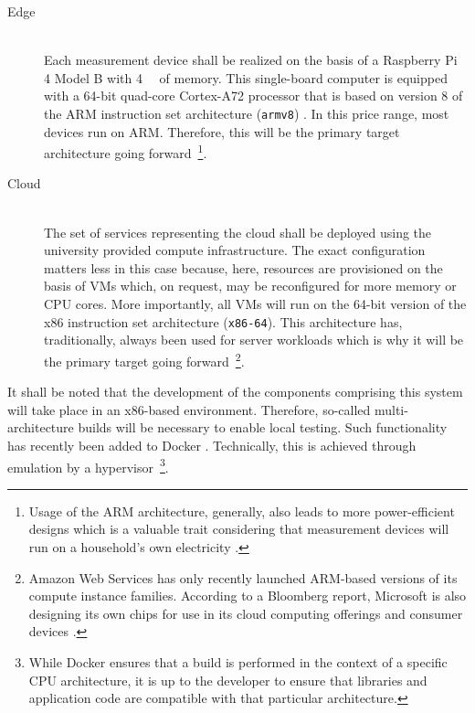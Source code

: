 \begin{description}
  \item[Edge]
  \hfill \\
  Each measurement device shall be realized on the basis of a Raspberry Pi 4 Model B with \SI{4}{\giga\byte} of memory. This single-board computer is equipped with a 64-bit quad-core Cortex-A72 processor that is based on version 8 of the \acs{ARM} instruction set architecture (\texttt{armv8}) \cite{raspberrypi4} \cite{arm2020v8a}. In this price range, most devices run on \acs{ARM}. Therefore, this will be the primary target architecture going forward~\footnote{Usage of the \acs{ARM} architecture, generally, also leads to more power-efficient designs which is a valuable trait considering that measurement devices will run on a household's own electricity \cite[p.~8837]{morabito2017virtualization}.}.

  \item[Cloud]
  \hfill \\
  The set of services representing the cloud shall be deployed using the university provided compute infrastructure. The exact configuration matters less in this case because, here, resources are provisioned on the basis of \acsp{VM} which, on request, may be reconfigured for more memory or \acs{CPU} cores. More importantly, all \acsp{VM} will run on the 64-bit version of the x86 instruction set architecture (\texttt{x86-64}). This architecture has, traditionally, always been used for server workloads which is why it will be the primary target going forward~\footnote{Amazon Web Services has only recently launched \acs{ARM}-based versions of its compute instance families. According to a Bloomberg report, Microsoft is also designing its own chips for use in its cloud computing offerings and consumer devices \cite{bloomberg2020microsoft}.}.
\end{description}

It shall be noted that the development of the components comprising this system will take place in an x86-based environment. Therefore, so-called multi-architecture builds will be necessary to enable local testing. Such functionality has recently been added to Docker \cite{docker2020multi}. Technically, this is achieved through emulation by a hypervisor~\footnote{While Docker ensures that a build is performed in the context of a specific \acs{CPU} architecture, it is up to the developer to ensure that libraries and application code are compatible with that particular architecture.}.


